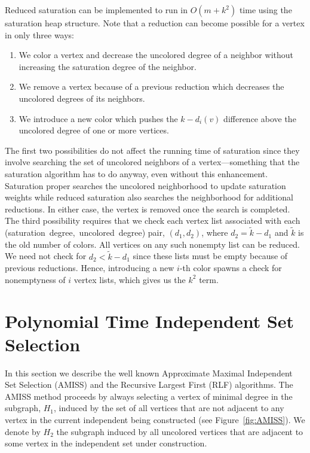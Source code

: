Reduced saturation can be implemented to run in $O(m + k^2)$ time using the 
saturation heap structure.  Note that a reduction can become possible for a 
vertex in only three ways:
\begin{enumerate}
\item We color a vertex and decrease the uncolored degree of a neighbor without
 increasing the saturation degree of the neighbor. 
\item We remove a vertex because of a previous reduction which decreases the
 uncolored degrees of its neighbors. 
\item We introduce a new color which pushes the $k - d_i(v)$ difference 
above the uncolored degree of one or more vertices.
\end{enumerate}
The first two possibilities do not affect the running time of saturation since
they involve searching the set of uncolored neighbors of a vertex---something
that the saturation algorithm has to do anyway, even without this enhancement.
Saturation proper searches the uncolored neighborhood to update saturation 
weights while reduced saturation also searches the neighborhood for additional 
reductions.  In either case, the vertex is removed once the search is completed.
The third possibility requires that we check each vertex list associated with 
each \mbox{(saturation degree, uncolored degree)} pair, $(d_1, d_2)$, where 
$d_2 = \tilde{k} - d_1$ and $\tilde{k}$ is the old number of colors.  All 
vertices on any such nonempty list can be reduced. We need not check for 
$d_2 < \tilde{k} - d_1$ since these lists must be empty because of previous 
reductions.  Hence, introducing a new $i$-th color spawns a check for 
nonemptyness of $i$ vertex lists, which gives us the $k^2$ term.

\section{Polynomial Time Independent Set Selection}
In this section we describe the well known Approximate Maximal Independent Set
Selection (AMISS) and the Recursive Largest First (RLF) algorithms.  
The AMISS method proceeds 
by always selecting a vertex of minimal degree in the subgraph, 
$H_1$, induced by the set of all vertices that are not adjacent
to any vertex in the current independent being 
constructed (see Figure~\ref{fig:AMISS}).
We denote by $H_2$ the subgraph induced by all uncolored vertices that are 
adjacent to some vertex in the independent set under construction.  


